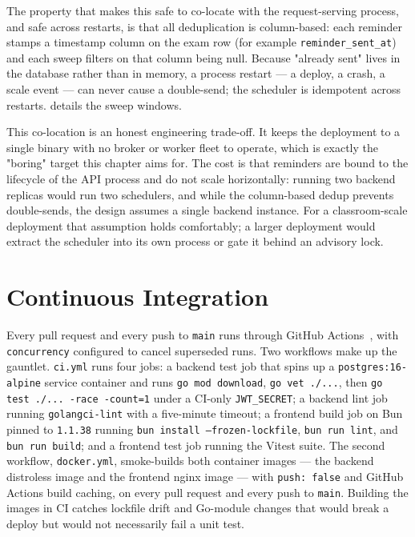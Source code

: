 The property that makes this safe to co-locate with the request-serving process, and safe across restarts, is that all deduplication is column-based: each reminder stamps a timestamp column on the exam row (for example \texttt{reminder\_sent\_at}) and each sweep filters on that column being null. Because "already sent" lives in the database rather than in memory, a process restart --- a deploy, a crash, a scale event --- can never cause a double-send; the scheduler is idempotent across restarts.  details the sweep windows.

This co-location is an honest engineering trade-off. It keeps the deployment to a single binary with no broker or worker fleet to operate, which is exactly the "boring" target this chapter aims for. The cost is that reminders are bound to the lifecycle of the API process and do not scale horizontally: running two backend replicas would run two schedulers, and while the column-based dedup prevents double-sends, the design assumes a single backend instance. For a classroom-scale deployment that assumption holds comfortably; a larger deployment would extract the scheduler into its own process or gate it behind an advisory lock.

\section{Continuous Integration}\label{sec:ch10-ci}

Every pull request and every push to \texttt{main} runs through GitHub Actions~\cite{githubactions}, with \texttt{concurrency} configured to cancel superseded runs. Two workflows make up the gauntlet. \texttt{ci.yml} runs four jobs: a backend test job that spins up a \texttt{postgres:16-alpine} service container and runs \texttt{go mod download}, \texttt{go vet ./...}, then \texttt{go test ./... -race -count=1} under a CI-only \texttt{JWT\_SECRET}; a backend lint job running \texttt{golangci-lint} with a five-minute timeout; a frontend build job on Bun pinned to \texttt{1.1.38} running \texttt{bun install --frozen-lockfile}, \texttt{bun run lint}, and \texttt{bun run build}; and a frontend test job running the Vitest suite. The second workflow, \texttt{docker.yml}, smoke-builds both container images --- the backend distroless image and the frontend nginx image --- with \texttt{push: false} and GitHub Actions build caching, on every pull request and every push to \texttt{main}. Building the images in CI catches lockfile drift and Go-module changes that would break a deploy but would not necessarily fail a unit test.


